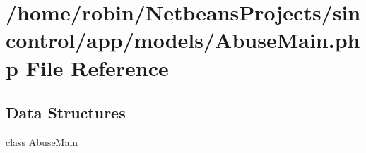 \hypertarget{_abuse_main_8php}{}\section{/home/robin/\+Netbeans\+Projects/sincontrol/app/models/\+Abuse\+Main.php File Reference}
\label{_abuse_main_8php}
\subsection*{Data Structures}
\begin{DoxyCompactItemize}
\item 
class \hyperlink{class_abuse_main}{Abuse\+Main}
\end{DoxyCompactItemize}
